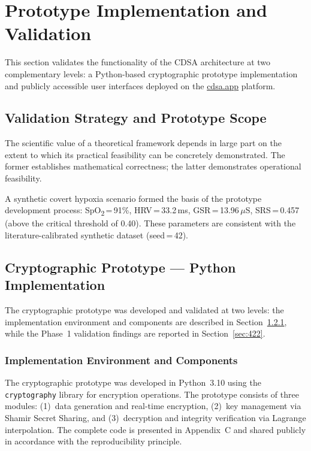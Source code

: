 \documentclass[12pt,a4paper]{article}
\begin{document}
\section{Prototype Implementation and Validation}
\label{sec:prototype}

This section validates the functionality of the CDSA architecture at two complementary levels:
a Python-based cryptographic prototype implementation and publicly accessible user interfaces
deployed on the \href{https://cdsa.app}{cdsa.app} platform.

\subsection{Validation Strategy and Prototype Scope}

The scientific value of a theoretical framework depends in large part on the extent to which
its practical feasibility can be concretely demonstrated. The former establishes mathematical
correctness; the latter demonstrates operational feasibility.

A synthetic covert hypoxia scenario formed the basis of the prototype development process:
SpO\textsubscript{2}\,=\,91\%, HRV\,=\,33.2\,ms, GSR\,=\,13.96\,$\mu$S, SRS\,=\,0.457
(above the critical threshold of 0.40). These parameters are consistent with the
literature-calibrated synthetic dataset (seed\,=\,42).

\subsection{Cryptographic Prototype --- Python Implementation}

The cryptographic prototype was developed and validated at two levels: the implementation
environment and components are described in Section~\ref{sec:421}, while the Phase~1 validation
findings are reported in Section~\ref{sec:422}.

\subsubsection{Implementation Environment and Components}
\label{sec:421}

\sloppy The cryptographic prototype was developed in Python~3.10 using the \texttt{cryptography} library for encryption operations. The prototype consists of three modules: (1)~data generation
and real-time encryption, (2)~key management via Shamir Secret Sharing, and (3)~decryption and
integrity verification via Lagrange interpolation. The complete code is presented in Appendix~C
and shared publicly in accordance with the reproducibility principle.
\end{document}

